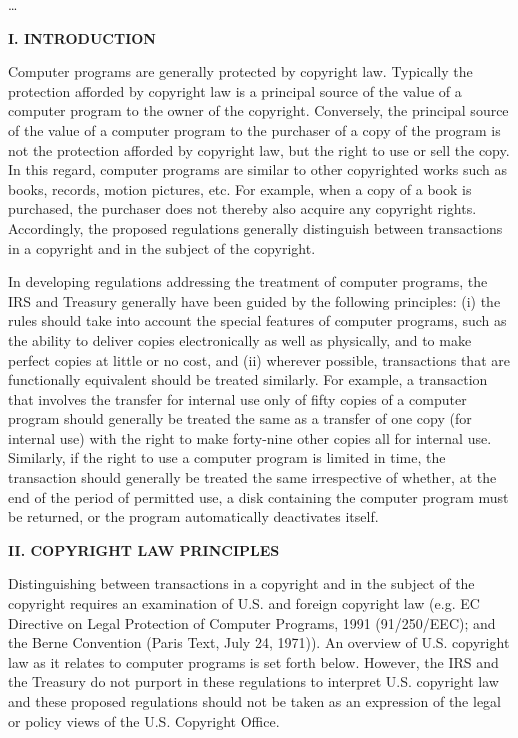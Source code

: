 \begin{select}
\ldots

\begin{center} \textbf{I. INTRODUCTION}
\end{center}
Computer programs are generally protected by copyright law. Typically the protection afforded by copyright law is a principal source of the value of a computer program to the owner of the copyright. Conversely, the principal source of the value of a computer program to the purchaser of a copy of the program is not the protection afforded by copyright law, but the right to use or sell the copy. In this regard, computer programs are similar to other copyrighted works such as books, records, motion pictures, etc. For example, when a copy of a book is purchased, the purchaser does not thereby also acquire any copyright rights. Accordingly, the proposed regulations generally distinguish between transactions in a copyright and in the subject of the copyright.

In developing regulations addressing the treatment of computer programs, the IRS and Treasury generally have been guided by the following principles: (i) the rules should take into account the special features of computer programs, such as the ability to deliver copies electronically as well as physically, and to make perfect copies at little or no cost, and (ii) wherever possible, transactions that are functionally equivalent should be treated similarly. For example, a transaction that involves the transfer for internal use only of fifty copies of a computer program should generally be treated the same as a transfer of one copy (for internal use) with the right to make forty-nine other copies all for internal use. Similarly, if the right to use a computer program is limited in time, the transaction should generally be treated the same irrespective of whether, at the end of the period of permitted use, a disk containing the computer program must be returned, or the program automatically deactivates itself.

\begin{center} \textbf{II. COPYRIGHT LAW PRINCIPLES}
\end{center}

Distinguishing between transactions in a copyright and in the subject of the copyright requires an examination of U.S. and foreign copyright law (e.g. EC Directive on Legal Protection of Computer Programs, 1991 (91/250/EEC); and the Berne Convention (Paris Text, July 24, 1971)). An overview of U.S. copyright law as it relates to computer programs is set forth below. However, the IRS and the Treasury do not purport in these regulations to interpret U.S. copyright law and these proposed regulations should not be taken as an expression of the legal or policy views of the U.S. Copyright Office.


\end{select}
